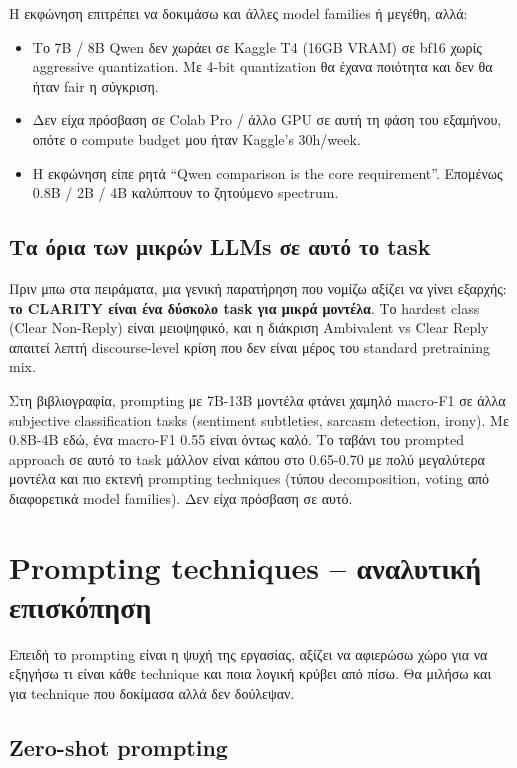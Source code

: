 \documentclass[12pt]{fphw}
\begin{document}
Η εκφώνηση επιτρέπει να δοκιμάσω και άλλες model families ή μεγέθη, αλλά:

\begin{itemize}
    \item Το 7B / 8B Qwen δεν χωράει σε Kaggle T4 (16GB VRAM) σε bf16 χωρίς aggressive quantization. Με 4-bit quantization θα έχανα ποιότητα και δεν θα ήταν fair η σύγκριση.
    \item Δεν είχα πρόσβαση σε Colab Pro / άλλο GPU σε αυτή τη φάση του εξαμήνου, οπότε ο compute budget μου ήταν Kaggle's 30h/week.
    \item Η εκφώνηση είπε ρητά ``Qwen comparison is the core requirement''. Επομένως 0.8B / 2B / 4B καλύπτουν το ζητούμενο spectrum.
\end{itemize}

\subsection{Τα όρια των μικρών LLMs σε αυτό το task}

Πριν μπω στα πειράματα, μια γενική παρατήρηση που νομίζω αξίζει να γίνει εξαρχής: \textbf{το CLARITY είναι ένα δύσκολο task για μικρά μοντέλα}. Το hardest class (Clear Non-Reply) είναι μειοψηφικό, και η διάκριση Ambivalent vs Clear Reply απαιτεί λεπτή discourse-level κρίση που δεν είναι μέρος του standard pretraining mix.

Στη βιβλιογραφία, prompting με 7B-13B μοντέλα φτάνει χαμηλό macro-F1 σε άλλα subjective classification tasks (sentiment subtleties, sarcasm detection, irony). Με 0.8B-4B εδώ, ένα macro-F1 0.55 είναι όντως καλό. Το ταβάνι του prompted approach σε αυτό το task μάλλον είναι κάπου στο 0.65-0.70 με πολύ μεγαλύτερα μοντέλα και πιο εκτενή prompting techniques (τύπου decomposition, voting από διαφορετικά model families). Δεν είχα πρόσβαση σε αυτό.

\section{Prompting techniques -- αναλυτική επισκόπηση}

Επειδή το prompting είναι η ψυχή της εργασίας, αξίζει να αφιερώσω χώρο για να εξηγήσω τι είναι κάθε technique και ποια λογική κρύβει από πίσω. Θα μιλήσω και για technique που δοκίμασα αλλά δεν δούλεψαν.

\subsection{Zero-shot prompting}
\end{document}
